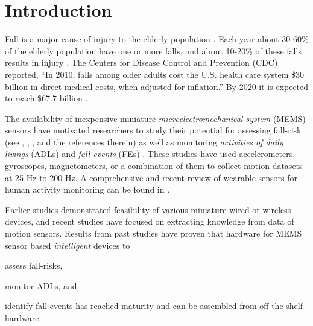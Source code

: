 \documentclass[]{IEEEtran}
\begin{document}
\section{Introduction}
\label{sec:Intro}
Fall is a major cause of injury to the elderly population
\cite{Rubenstein2006}.  Each year about 30-60\% of the elderly population have
one or more falls, and  about 10-20\% of these falls results in injury
\cite{Rubenstein2006}.  The Centers for Disease Control and Prevention (CDC)
reported, ``In 2010, falls among older adults cost the U.S. health care system
\$30 billion in direct medical costs, when adjusted for inflation.'' By 2020 it
is expected to reach \$67.7 billion \cite{CDC2014July}.  \par The availability
of inexpensive miniature \emph{microelectromechanical system} (MEMS) sensors
have motivated researchers  to study their potential for assessing fall-risk
(see \cite{howcroftReview2013}, \cite{MukReview15}, \cite{shany2012sensors}, and
the references therein) as well as monitoring \emph{activities of daily
livings} (ADLs)
\cite{MukReview15,d2014simple,kan2012wearable,alvarezActivityAndFallRecognotion2015,BaoActivityrecognition2004,DernbachActivityAndFallDetectionPhone2012,krishnanActivityRecognition2014,kumarActivitAndFallDetection2013}
and \emph{fall events} (FEs)
\cite{baekFallDetection2013,baiFallDetectionPhone2013,DernbachActivityAndFallDetectionPhone2012,shany2012sensors,ranhotigmage2013human,dumitracheFallDetection2013,kumarActivitAndFallDetection2013,leoneFallDetection2013,liangFallDetection2012,liFallDetection2009,Moya2015,ojetolaFallDetection2011,ShenFallDetectionPhone2015,steidlFallDetection2012,DoukasFallDetection2011,ErdoganFallDetection2014,JianFallDetection2015,aziz2011analysis}.
These studies have used accelerometers, gyroscopes, magnetometers, or a
combination of them to collect motion datasets at  25 Hz to 200 Hz.  A comprehensive and recent review of wearable sensors for human activity monitoring can be found in \cite{MukReview15}.
\par
Earlier studies demonstrated feasibility of various miniature wired or wireless
devices, and recent studies have focused on extracting knowledge from data of
motion sensors.  Results from past studies have proven  that hardware for MEMS
sensor based \emph{intelligent} devices to \begin{inparaenum} [($i$)] \item
assess fall-risks, \item monitor ADLs, and \item identify fall events has
reached maturity and can be assembled from off-the-shelf hardware.
\end{inparaenum}   
\end{document}
